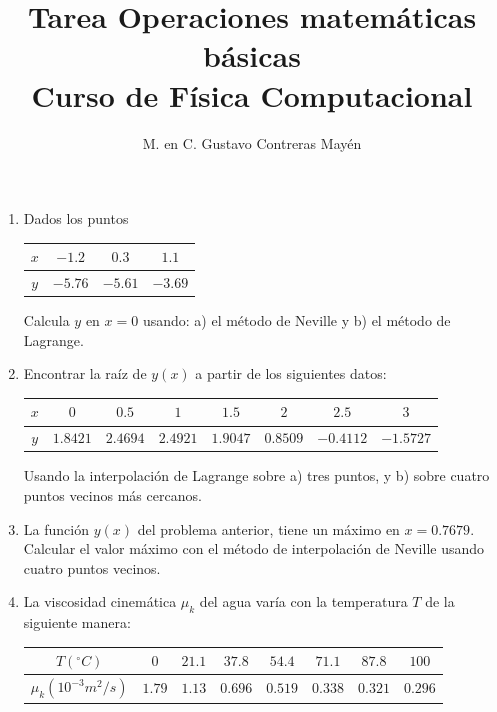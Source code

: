 \documentclass[11pt]{article}
\title{Tarea Operaciones matemáticas básicas \\ Curso de Física Computacional}
\author{M. en C. Gustavo Contreras Mayén}
\date{ }
\begin{document}
\maketitle
\fontsize{14}{14}\selectfont
\begin{enumerate}
	\item Dados los puntos
	\begin{table}[H]
		\centering 
		\begin{large}
			\begin{tabulary}{15cm}{c | c | c | c  }\normalsize
				$x$ & $-1.2$ & $0.3$ & $1.1$ \\
				\midrule
				$y$ & $-5.76$ & $-5.61$ & $-3.69$
			\end{tabulary}
		\end{large}
	\end{table}
	Calcula $y$ en $x=0$ usando: a) el método de Neville y b) el método de Lagrange.
	\item Encontrar la raíz de $y(x)$ a partir de los siguientes datos:
	\begin{table}[H]
		\centering 
		\begin{large}
			\begin{tabulary}{15cm}{c | c | c | c | c | c | c | c }
				$x$ & $0$ & $0.5$ & $1$ & $1.5$ & $2$ & $2.5$ & $3$ \\
				\midrule
				$y$ & $1.8421$ & $2.4694$ & $2.4921$ & $1.9047$ & $0.8509$ & $-0.4112$ & $-1.5727$ 
			\end{tabulary}
		\end{large}	
	\end{table}
	Usando la interpolación de Lagrange sobre a) tres puntos, y b) sobre cuatro puntos vecinos m\'{a}s cercanos.
	\item La función $y(x)$ del problema anterior, tiene un m\'{a}ximo en $x=0.7679$. Calcular el valor m\'{a}ximo con el método de interpolación de Neville usando cuatro puntos vecinos.
	\item La viscosidad cinem\'{a}tica $\mu_{k}$ del agua varía con la temperatura $T$ de la siguiente manera:
	\begin{table}[H]
		\centering
			\begin{large} 
				\begin{tabulary}{15cm}{c | c | c | c | c | c | c | c }
					$T(^\circ C)$ & $0$ & $21.1$ & $37.8$ & $54.4$ & $71.1$ & $87.8$ & $100$ \\
					\midrule
					$\mu_{k} (10^{-3}m^{2}/s)$ & $1.79$ & $1.13$ & $0.696$ & $0.519$ & $0.338$ & $0.321$ & $0.296$ 
				\end{tabulary}

\end{large}
\end{table}
\end{enumerate}
\end{document}
